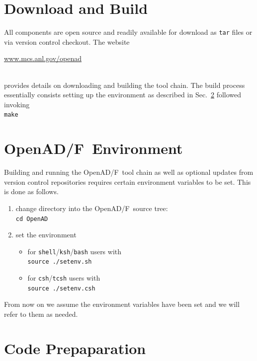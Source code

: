 \documentclass{book}
\newcommand{\OpenADF}{OpenAD/F}
\newcommand{\code}[1]{{\small\tt{#1}}}
\newcommand{\refsec}[1]{{Sec.~\ref{#1}}}
\begin{document}
\section{Download and Build}\label{sec:dab}
All components are open source and readily available for download as {\tt tar} files
or via version control checkout. 
The website\\[1ex] 
\centerline{\url{www.mcs.anl.gov/openad}}\\[1ex]
provides details on downloading and building the tool chain. 
The build process essentially consists setting up the environment as described in 
\refsec{sec:env} followed invoking\\[1ex]   
\hspace*{.3cm}\lstinline{make} \\[1ex] 

\section{\OpenADF\ Environment}\label{sec:env}
Building and running the \OpenADF\  tool chain as well as optional updates from 
version control repositories requires certain environment variables to be set. 
This is done as follows.
\begin{enumerate}
\item change directory into the \OpenADF\ source tree:\\
\code {cd OpenAD}
\item set the environment 
\begin{itemize}
\item for \lstinline{shell}/\lstinline{ksh}/\lstinline{bash} users with\\
\code{source ./setenv.sh}
\item for \lstinline{csh}/\lstinline{tcsh} users with\\
\code{source ./setenv.csh}
\end{itemize}
\end{enumerate}
From now on we assume the environment variables have been set and we will refer 
to them as needed.  

\section{Code Prepaparation}
\end{document}
